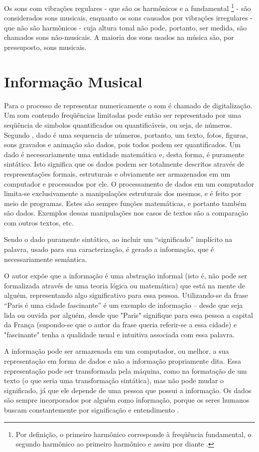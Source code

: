 Os sons com vibrações regulares - que são os harmônicos e a fundamental \footnote{Por definição, o primeiro harmônico corresponde à freqüência fundamental, o segundo harmônico ao primeiro harmônico e assim por diante \cite{muller2007}.} - são considerados sons musicais, enquanto os sons causados por vibrações irregulares - que não são harmônicos - cuja altura tonal não pode, portanto, ser medida, são chamados sons não-musicais. A maioria dos sons usados na música são, por pressuposto, sons musicais.

\section{Informação Musical}
Para  o processo de representar numericamente o som é chamado de digitalização. Um som contendo freqüências limitadas pode então ser representado por uma seqüência de simbolos quantificados ou quantificáveis, ou seja, de números. Segundo , dado é uma sequencia de números, portanto, um texto, fotos, figuras, sons gravados e animação são dados, pois todos podem ser quantificados. Um dado é necessariamente uma entidade matemática e, desta forma, é puramente sintático. Isto significa que os dados podem ser totalmente descritos através de respresentações formais, estruturais e obviamente ser armazenados em um computador e processados por ele. O processamento de dados em um computador limita-se exclusivamente a manipulações estruturais dos mesmos, e é feito por meio de programas. Estes são sempre funções matemáticas, e portanto também são dados. Exemplos dessas manipulações nos casos de textos são a comparação com outros textos, etc.

Sendo o dado puramente sintático, ao incluir um “significado” implícito na palavra, usado para sua caracterização, é gerado a informação, que é necessariamente semântica.

O autor expõe que a informação é uma abstração informal (isto é, não pode ser formalizada através de uma teoria lógica ou matemática) que está na mente de alguém, representando algo significativo para essa pessoa. Utilizando-se da frase “Paris é uma cidade fascinante” é um exemplo de informação – desde que seja lida ou ouvida por alguém, desde que "Paris" signifique para essa pessoa a capital da França (supondo-se que o autor da frase queria referir-se a essa cidade) e "fascinante" tenha a qualidade usual e intuitiva associada com essa palavra.

A informação pode ser armazenada em um computador, ou melhor, a sua representação em forma de dados e não a informação propriamente dita. Essa representação pode ser transformada pela máquina, como na formatação de um texto (o que seria uma transformação sintática), mas não pode mudar o significado, já que ele depende de uma pessoa que possui a informação. Os dados são sempre incorporados por alguém como informação, porque os seres humanos buscam constantemente por significação e entendimento .

